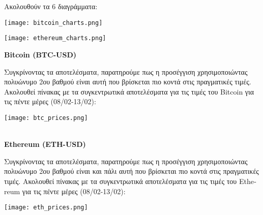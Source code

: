 \documentclass{article}
\begin{document}
\begin{center}
    Ακολουθούν τα 6 διαγράμματα:
\end{center}
\pagebreak
\begin{center}
    \texttt{[image: bitcoin\_charts.png]}
    \thispagestyle{empty}
    \pagebreak
\end{center}
\begin{center}
    \texttt{[image: ethereum\_charts.png]}
    \thispagestyle{empty}
\end{center}
\begin{center}
\large{\textbf{\textlatin{Bitcoin (BTC-USD)}}}
\end{center}
Συγκρίνοντας τα αποτελέσματα, παρατηρούμε πως η προσέγγιση χρησιμοποιώντας πολυώνυμο 2ου βαθμού είναι αυτή που βρίσκεται πιο κοντά στις πραγματικές τιμές. Ακολουθεί πίνακας με τα συγκεντρωτικά αποτελέσματα για τις τιμές του \textlatin{Bitcoin} για τις πέντε μέρες (08/02-13/02): \\
\begin{center}
    \texttt{[image: btc\_prices.png]}
    \\~\\
\end{center}
\begin{center}

\large{\textbf{\textlatin{Ethereum (ETH-USD)}}}
\end{center}
Συγκρίνοντας τα αποτελέσματα, παρατηρούμε πως η προσέγγιση χρησιμοποιώντας πολυώνυμο 2ου βαθμού είναι και πάλι αυτή που βρίσκεται πιο κοντά στις πραγματικές τιμές. Ακολουθεί πίνακας με τα συγκεντρωτικά αποτελέσματα για τις τιμές του \textlatin{Ethereum} για τις πέντε μέρες (08/02-13/02): \\
\begin{center}
    \texttt{[image: eth\_prices.png]}
\end{center}
\end{document}
